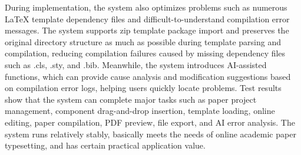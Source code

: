 During implementation, the system also optimizes problems such as numerous LaTeX template dependency files and difficult-to-understand compilation error messages. The system supports zip template package import and preserves the original directory structure as much as possible during template parsing and compilation, reducing compilation failures caused by missing dependency files such as .cls, .sty, and .bib. Meanwhile, the system introduces AI-assisted functions, which can provide cause analysis and modification suggestions based on compilation error logs, helping users quickly locate problems. Test results show that the system can complete major tasks such as paper project management, component drag-and-drop insertion, template loading, online editing, paper compilation, PDF preview, file export, and AI error analysis. The system runs relatively stably, basically meets the needs of online academic paper typesetting, and has certain practical application value.